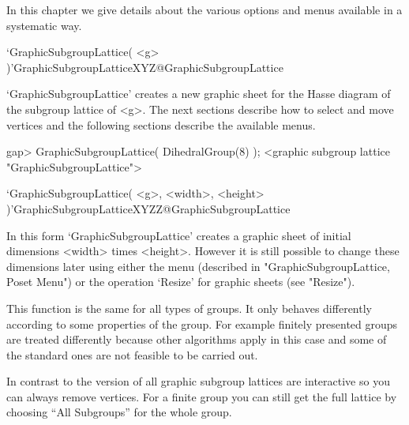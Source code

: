 
In this chapter we give details about the various options and menus
available in a systematic way.


\>`GraphicSubgroupLattice( <g> )'{GraphicSubgroupLatticeXYZ}@{GraphicSubgroupLattice}

`GraphicSubgroupLattice' creates a new graphic sheet for the Hasse
diagram of the subgroup lattice of <g>.  The next sections describe
how to select and move vertices and the following sections describe the
available menus.

\begintt
gap> GraphicSubgroupLattice( DihedralGroup(8) );
<graphic subgroup lattice "GraphicSubgroupLattice">
\endtt

\>`GraphicSubgroupLattice( <g>, <width>, <height> )'{GraphicSubgroupLatticeXYZZ}@{GraphicSubgroupLattice}

In this form `GraphicSubgroupLattice' creates a graphic sheet of initial
dimensions <width> times <height>.  However it is still possible to change
these dimensions later using either the menu (described in
"GraphicSubgroupLattice, Poset Menu") or the operation `Resize' for graphic 
sheets (see "Resize").

This function is the same for all types of groups. It only behaves differently
according to some properties of the group. For example finitely presented
groups are treated differently because other algorithms apply in this case
and some of the standard ones are not feasible to be carried out. 

In contrast to the {} version of {\XGAP} all graphic subgroup lattices 
are interactive so you can always remove vertices. For a finite group you 
can still get the full lattice by choosing ``All Subgroups'' for the whole 
group.

%


